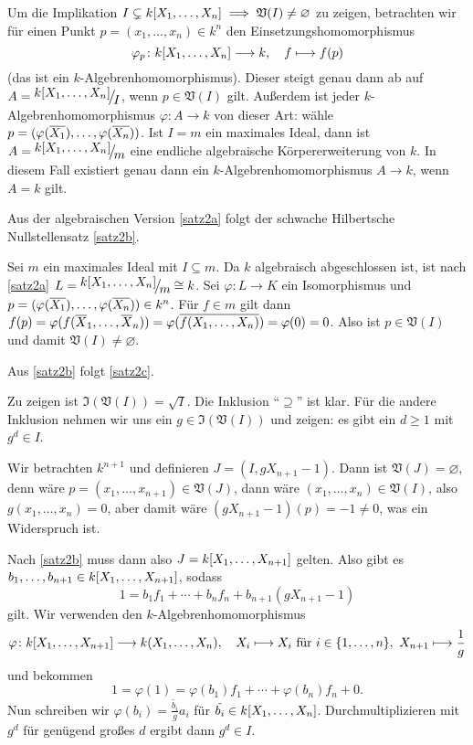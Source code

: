 \documentclass[a4paper,12pt]{scrbook}
\makeatletter
\theoremstyle{blah}
\theoremstyle{stz}
\renewcommand{\proofname}{Beweis}
\renewenvironment{proof}[1][\proofname]{\par
  \pushQED{\qed}%
  \normalfont \topsep6\p@\@plus6\p@\relax
  \trivlist
  \item[\hskip\labelsep
        \itshape
    #1\@addpunct{:}]\ignorespaces
}{%
  \popQED\endtrivlist\@endpefalse
}
\def\V{\mathfrak{V}}
\def\I{\mathfrak{I}}
\newcommand{\ra}{\longrightarrow}
\renewcommand{\phi}{\varphi}
\newcommand{\leer}{\ensuremath{\varnothing}}
\renewcommand{\mapsto}{\longmapsto}
\def\Bar#1{\ensuremath\overline{#1}}
\newcommand{\Quotient}[2]{
  \raisebox{0.7ex}{\ensuremath{#1}}
  \ensuremath{\mkern-3mu}\big/\ensuremath{\mkern-3mu}
  \raisebox{-0.6ex}{\ensuremath{#2}}}
\newcommand{\polyx}[1][n]{\ensuremath%
  [X_{1},\dotsc,X_{#1}]}
\makeatother
\begin{document}

Um die Implikation $I\subsetneq k\polyx \implies \V(I)\neq\leer$ zu zeigen, betrachten wir für einen Punkt $p=(x_1,\dotsc,x_n)\in
k^n$ den Einsetzungshomomorphismus \[ \phi_p\colon k\polyx \ra k, \quad f\mapsto f(p) \] (das ist ein
$k$-Algebrenhomomorphismus). Dieser steigt genau dann ab auf $A=\Quotient{k\polyx}{I}$, wenn $p\in\V(I)$ gilt. Außerdem ist jeder
$k$-Algebrenhomomorphismus $\phi\colon A\ra k$ von dieser Art: wähle $p=(\phi(\Bar{X_1}),\dotsc,\phi(\Bar{X_n}))$. Ist $I=m$ ein
maximales Ideal, dann ist $A=\Quotient{k\polyx}{m}$ eine endliche algebraische Körpererweiterung von $k$. In diesem Fall
existiert genau dann ein $k$-Algebrenhomomorphismus $A\ra k$, wenn $A=k$ gilt.

\begin{lem}\label{1.3.4}
  Aus der algebraischen Version \ref{satz2a} folgt der schwache Hilbertsche Nullstellensatz \ref{satz2b}.
\end{lem}
\begin{proof}
  Sei $m$ ein maximales Ideal mit $I\subseteq m$. Da $k$ algebraisch abgeschlossen ist, ist nach \ref{satz2a}
  $L=\Quotient{k\polyx}{m}\cong k$. Sei $\phi\colon L\ra K$ ein Isomorphismus und $p=(\phi(\Bar{X_1}),\dotsc,\phi(\Bar{X_n}))\in
  k^n$. Für $f\in m$ gilt dann $f(p)=\phi(f(\Bar{X}_1,\dotsc,\Bar{X}_n))=\phi(\Bar{f(X_1,\dotsc,X_n)}) = \phi(0)=0$. Also ist
  $p\in\V(I)$ und damit $\V(I)\neq\leer$.
\end{proof}

\begin{lem}
  Aus \ref{satz2b} folgt \ref{satz2c}.
\end{lem}
\begin{proof}
Zu zeigen ist $\I(\V(I))=\sqrt{I}$. Die Inklusion \enquote{$\supseteq$} ist klar. Für die andere Inklusion nehmen wir uns ein
$g\in\I(\V(I))$ und zeigen: es gibt ein $d\ge1$ mit $g^d\in I$.

Wir betrachten $k^{n+1}$ und definieren $J=(I,gX_{n+1}-1)$. Dann ist $\V(J)=\leer$, denn wäre
$p=(x_1,\dotsc,x_{n+1})\in\V(J)$, dann wäre $(x_1,\dotsc,x_n)\in\V(I)$, also $g(x_1,\dotsc,x_n)=0$, aber damit wäre
$(gX_{n+1}-1)(p)=-1\neq0$, was ein Widerspruch ist.

Nach \ref{satz2b} muss dann also $J=k\polyx[n+1]$ gelten. Also gibt es $b_1,\dotsc,b_{n+1}\in k\polyx[n+1]$, sodass
\[ 1=b_1f_1 + \dotsm + b_nf_n + b_{n+1}(gX_{n+1}-1) \] gilt. Wir verwenden den $k$-Algebrenhomomorphismus
\[ \phi\colon k\polyx[n+1] \ra k(X_1,\dotsc,X_n),\quad X_i\mapsto X_i \text{ für } i\in\{1,\dotsc,n\},\ X_{n+1}\mapsto\frac1g \]
und bekommen
\[ 1 = \phi(1) = \phi(b_1)f_1 + \dotsm + \phi(b_n)f_n + 0. \]
Nun schreiben wir $\phi(b_i)=\frac{\tilde{b_i}}{g}a_i$ für $\tilde{b_i}\in k\polyx$. Durchmultiplizieren mit $g^d$ für genügend
großes $d$ ergibt dann $g^d\in I$.
\end{proof}
\end{document}
